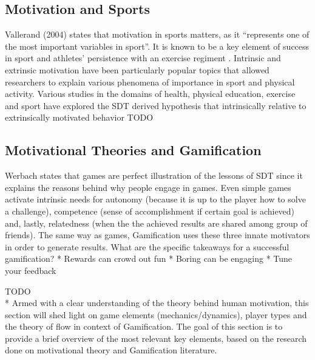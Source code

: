 \subsection{Motivation and Sports}

Vallerand (2004) states that motivation in sports matters, as it ``represents one of the most important variables in sport''. It is known to be a key element of success in sport and athletes' persistence with an exercise regiment \cite{vallerand2007intrinsic}. Intrinsic and extrinsic motivation have been particularly popular topics that allowed researchers to explain various phenomena of importance in sport and physical activity. Various studies in the domains of health, physical education, exercise and sport have explored the SDT derived hypothesis that intrinsically relative to extrinsically motivated behavior  
TODO
\subsection{Motivational Theories and Gamification}

Werbach states that games are perfect illustration of the lessons of SDT since it explains the reasons behind why people engage in games. Even simple games activate intrinsic needs for autonomy (because it is up to the player how to solve a challenge), competence (sense of accomplishment if certain goal is achieved) and, lastly, relatedness (when the the achieved results are shared among group of friends). The same way as games, Gamification uses these three innate motivators in order to generate results.
What are the specific takeaways for a successful gamification?
* Rewards can crowd out fun
* Boring can be engaging
* Tune your feedback

TODO
\\*
Armed with a clear understanding of the theory behind human motivation, this section will shed light on game elements (mechanics/dynamics), player types and the theory of flow in context of Gamification. The goal of this section is to provide a brief overview of the most relevant key elements, based on the research done on motivational theory and Gamification literature.

